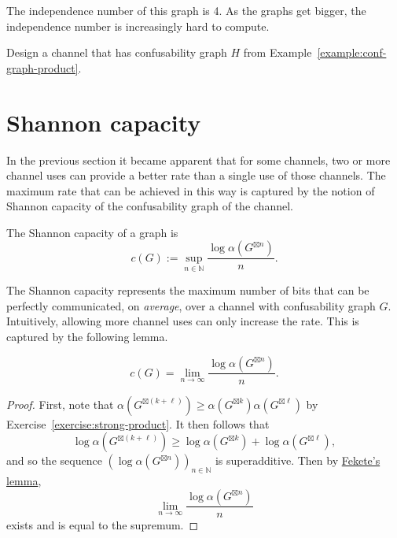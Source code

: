 \begin{example}
\begin{center}
\end{center}
The independence number of this graph is 4. As the graphs get bigger, the independence number is increasingly hard to compute.
\end{example}

\begin{exercise}
Design a channel that has confusability graph $H$ from Example~\ref{example:conf-graph-product}.
\end{exercise}


\section{Shannon capacity}
In the previous section it became apparent that for some channels, two or more channel uses can provide a better rate than a single use of those channels. The maximum rate that can be achieved in this way is captured by the notion of Shannon capacity of the confusability graph of the channel.
\begin{definition}
The Shannon capacity of a graph is \[c(G) := \sup_{n \in \mathbb{N}} \frac{\log \alpha(G^{\boxtimes n})}{n}.\]
\end{definition}
The Shannon capacity represents the maximum number of bits that can be perfectly communicated, on \emph{average}, over a channel with confusability graph $G$. Intuitively, allowing more channel uses can only increase the rate. This is captured by the following lemma.

\begin{proposition}
\[
c(G) = \lim_{n \to \infty} \frac{\log \alpha(G^{\boxtimes n})}{n}.
\]
\end{proposition}
\begin{proof}
First, note that $\alpha(G^{\boxtimes (k+\ell)}) \geq \alpha(G^{\boxtimes k})\alpha(G^{\boxtimes \ell})$ by Exercise~\ref{exercise:strong-product}. It then follows that
\[
\log \alpha(G^{\boxtimes(k+\ell)}) \geq \log \alpha(G^{\boxtimes k}) + \log \alpha(G^{\boxtimes \ell}),
\]
and so the sequence $(\log \alpha(G^{\boxtimes n}))_{n \in \mathbb{N}}$ is superadditive. Then by \href{https://en.wikipedia.org/wiki/Superadditivity}{Fekete's lemma},
\[
\lim_{n \to \infty} \frac{\log \alpha(G^{\boxtimes n})}{n}
\]
exists and is equal to the supremum.
\end{proof}

